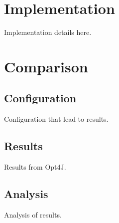 \documentclass[10pt, a4paper]{article}
\begin{document}
\section{Implementation}
\label{sec:implementation}
Implementation details here.


\section{Comparison}
\label{sec:comparison}

\subsection{Configuration} %
\label{sub:configuration}
Configuration that lead to results.

\subsection{Results} %
\label{sub:results}
Results from Opt4J.

\subsection{Analysis} %
\label{sub:analysis}
Analysis of results.

% 
%  
\end{document}
